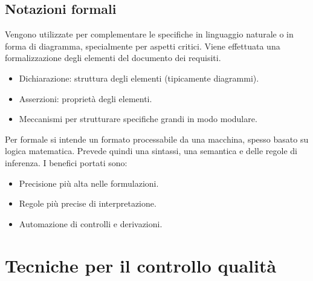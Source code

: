 \documentclass[../main.tex]{subfiles}
\begin{document}
\subsection{Notazioni formali}
Vengono utilizzate per complementare le specifiche in linguaggio naturale o in forma di diagramma, specialmente per aspetti critici.
Viene effettuata una formalizzazione degli elementi del documento dei requisiti.
\begin{itemize}
	\item Dichiarazione: struttura degli elementi (tipicamente diagrammi).
	\item Asserzioni: proprietà degli elementi.
	\item Meccanismi per strutturare specifiche grandi in modo modulare. 
\end{itemize}
Per formale si intende un formato processabile da una macchina, spesso basato su logica matematica. Prevede quindi una sintassi, una semantica e delle regole di inferenza.
I benefici portati sono:
\begin{itemize}
	\item Precisione più alta nelle formulazioni.
	\item Regole più precise di interpretazione.
	\item Automazione di controlli e derivazioni.
\end{itemize}
\section{Tecniche per il controllo qualità}
\end{document}

